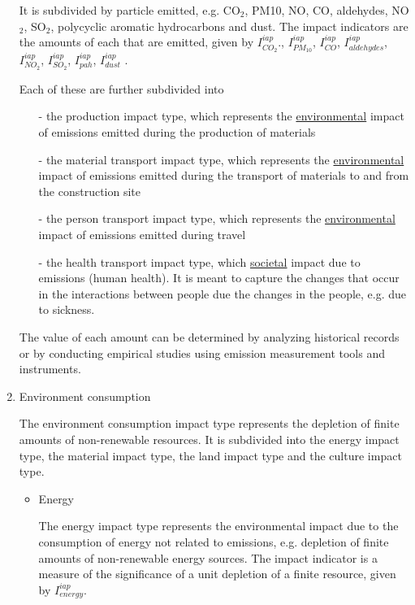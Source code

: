 \begin{enumerate}
It is subdivided by particle emitted, e.g. CO$_{2}$, PM10, NO, CO, aldehydes, NO$_{2}$, SO$_{2}$, polycyclic aromatic hydrocarbons and dust. The impact indicators are the amounts of each that are emitted, given by $I_{C{O_2}}^{iap}$., $I_{P{M_{10}}}^{iap}$, $I_{CO}^{iap}$, $I_{aldehydes}^{iap}$, $I_{N{O_2}}^{iap}$, $I_{S{O_2}}^{iap}$, $I_{pah}^{iap}$,  $I_{dust}^{iap}$ .

Each of these are further subdivided into 

\begin{itemize}
	\item[-] the production impact type, which represents the \underline{environmental} impact of emissions emitted during the production of materials
	\item[-] the material transport impact type, which represents the \underline{environmental} impact of emissions emitted during the transport of materials to and from the construction site
	\item[-] the person transport impact type, which represents the \underline{environmental} impact of emissions emitted during travel
	\item[-] the health transport impact type, which \underline{societal} impact due to emissions (human health). It is meant to capture the changes that occur in the interactions between people due the changes in the people, e.g. due to sickness.  
\end{itemize}

The value of each amount can be determined by analyzing historical records or by conducting empirical studies using emission measurement tools and instruments.

\item Environment consumption

The environment consumption impact type represents the depletion of finite amounts of non-renewable resources. It is subdivided into the energy impact type, the material impact type, the land impact type and the culture impact type.

\begin{itemize}
\item Energy

The energy impact type represents the environmental impact due to the consumption of energy not related to emissions, e.g. depletion of finite amounts of non-renewable energy sources. The impact indicator is a measure of the significance of a unit depletion of a finite resource, given by $I_{energy}^{iap}$.


\end{itemize}
\end{enumerate}
